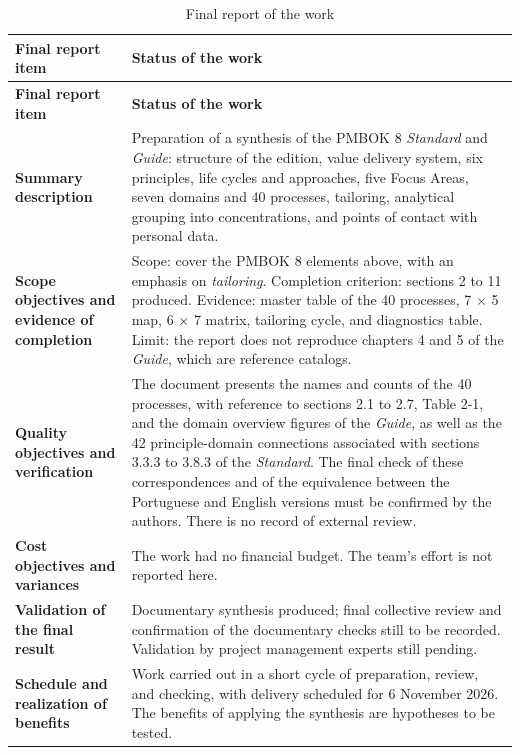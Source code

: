 \documentclass[11pt,a4paper]{article}
\newcommand{\SingleSpacing}{}
\begin{document}
\begingroup\SingleSpacing\small
\begin{longtable}{@{}>{\raggedright\arraybackslash}p{}>{\raggedright\arraybackslash}p{}@{}}
\caption{Final report of the work}\label{tab:t14}\\
\toprule
\textbf{Final report item} & \textbf{Status of the work}\\
\midrule
\endfirsthead
\toprule
\textbf{Final report item} & \textbf{Status of the work}\\
\midrule
\endhead
\bottomrule
\endfoot
\bottomrule
\endlastfoot
\textbf{Summary description} & Preparation of a synthesis of the PMBOK 8 \textit{Standard} and \textit{Guide}: structure of the edition, value delivery system, six principles, life cycles and approaches, five Focus Areas, seven domains and 40 processes, tailoring, analytical grouping into concentrations, and points of contact with personal data.\\[3pt]
\textbf{Scope objectives and evidence of completion} & Scope: cover the PMBOK 8 elements above, with an emphasis on \textit{tailoring}. Completion criterion: sections 2 to 11 produced. Evidence: master table of the 40 processes, 7 \ensuremath{\times} 5 map, 6 \ensuremath{\times} 7 matrix, tailoring cycle, and diagnostics table. Limit: the report does not reproduce chapters 4 and 5 of the \textit{Guide}, which are reference catalogs.\\[3pt]
\textbf{Quality objectives and verification} & The document presents the names and counts of the 40 processes, with reference to sections 2.1 to 2.7, Table 2-1, and the domain overview figures of the \textit{Guide}, as well as the 42 principle-domain connections associated with sections 3.3.3 to 3.8.3 of the \textit{Standard}. The final check of these correspondences and of the equivalence between the Portuguese and English versions must be confirmed by the authors. There is no record of external review.\\[3pt]
\textbf{Cost objectives and variances} & The work had no financial budget. The team's effort is not reported here.\\[3pt]
\textbf{Validation of the final result} & Documentary synthesis produced; final collective review and confirmation of the documentary checks still to be recorded. Validation by project management experts still pending.\\[3pt]
\textbf{Schedule and realization of benefits} & Work carried out in a short cycle of preparation, review, and checking, with delivery scheduled for 6 November 2026. The benefits of applying the synthesis are hypotheses to be tested.\\[3pt]

\end{longtable}
\end{document}
